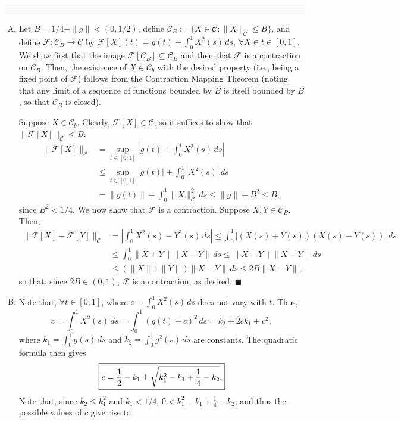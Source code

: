 \documentclass[11pt]{article}
\newcounter{questionCounter}
\newcounter{partCounter}[questionCounter]
\newenvironment{question}[2][\arabic{questionCounter}]{%
    \setcounter{partCounter}{0}%
    \vspace{.25in} \hrule \vspace{0.5em}%
        \noindent{\bf #2}%
    \vspace{0.8em} \hrule \vspace{.10in}%
    \addtocounter{questionCounter}{1}%
}{}
\renewcommand{\qed}{\quad $\blacksquare$}
\newcommand{\F}{\mathcal{F}}
\newcommand{\C}{\mathcal{C}}
\begin{document}
\newpage
\begin{question}{Problem 3}
\begin{enumerate}[A)]
\item Let $B = 1/4 + \|g\| < (0,1/2)$, define
$\C_B := \{X \in \C : \|X\|_{\C} \leq B\}$, and define
$\F : \C_B \rightarrow \C$ by $\F[X](t) = g(t) + \int_0^1 X^2(s) \, ds$,
$\forall X \in t \in [0,1]$. We show first that the image
$\F[\C_B] \subseteq \C_B$ and then that $\F$ is a contraction on $\C_B$. Then,
the existence of $X \in \C_b$ with the desired property (i.e., being a fixed
point of $\F$) follows from the Contraction Mapping Theorem (noting that any
limit of a sequence of functions bounded by $B$ is itself bounded by $B$, so
that $\C_B$ is closed).

Suppose $X \in \C_b$. Clearly, $\F[X] \in \C$, so it suffices to show that
$\|\F[X]\|_{\C} \leq B$:
\begin{align*}
\|\F[X]\|_{\C}
 & =    \sup_{t \in [0,1]} \left| g(t)  + \int_0^1 X^2(s) \, ds \right| \\
 & \leq \sup_{t \in [0,1]} \left| g(t) \right|
   +    \int_0^1 \left| X^2(s) \right| \, ds \\
 & =    \|g(t)\| + \int_0^1 \|X\|_{\C}^2  \, ds
   \leq \|g\| + B^2 \leq B,
\end{align*}
since $B^2 < 1/4$. We now show that $\F$ is a contraction. Suppose
$X,Y \in \C_B$. Then,
\begin{align*}
\|\F[X] - \F[Y]\|_{\C}
 & = \left| \int_0^1 X^2(s) - Y^2(s) \, ds \right|
   \leq \int_0^1 \left| (X(s) + Y(s))(X(s) - Y(s)) \right| \, ds \\
 & \leq \int_0^1 \|X + Y\|\|X - Y\| \, ds
   \leq \|X + Y\|\|X - Y\| \, ds \\
 & \leq \left( \|X\| + \|Y\| \right) \|X - Y\| \, ds \leq 2B \|X - Y\|,
\end{align*}
so that, since $2B \in (0,1)$, $\F$ is a contraction, as desired. \qed

\item Note that, $\forall t \in [0,1]$,  where
$c = \int_0^1 X^2(s) \, ds$ does not vary with $t$. Thus,
\[c
 = \int_0^1 X^2(s) \, ds
 = \int_0^1 (g(t) + c)^2 \, ds
 = k_2 + 2ck_1 + c^2,
\]
where $k_1 = \int_0^1 g(s) \, ds$ and $k_2 = \int_0^1 g^2(s) \, ds$ are
constants. The quadratic formula then gives
\[\mbox{\fbox{$\displaystyle
 c
 = \frac{1}{2} - k_1 \pm \sqrt{k_1^2 - k_1 + \frac{1}{4} - k_2}$.}}
\]
Note that, since $k_2 \leq k_1^2$ and $k_1 < 1/4$,
$0 < k_1^2 - k_1 + \frac{1}{4} - k_2$, and thus the possible values of $c$
give rise to 
\end{enumerate}
\end{question}
\end{document}

